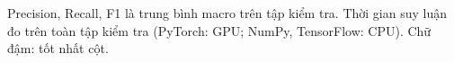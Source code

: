 Precision, Recall, F1 là trung bình macro trên tập kiểm tra. Thời gian suy luận đo trên toàn tập kiểm tra (PyTorch: GPU; NumPy, TensorFlow: CPU). Chữ đậm: tốt nhất cột.
